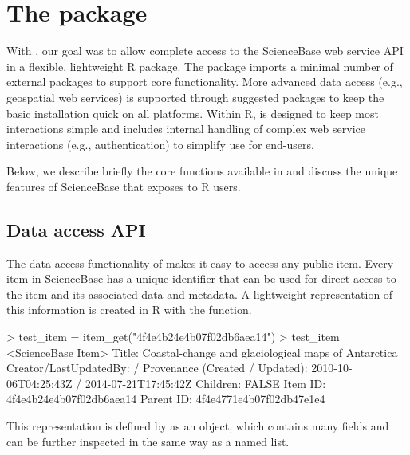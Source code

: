 
\section{The  package}

With , our goal was to allow complete
access to the ScienceBase web service API in a flexible, lightweight
R package. The package imports a minimal number of external packages
to support core functionality. More advanced data access (e.g., geospatial
web services) is supported through suggested packages to keep the basic
installation quick on all platforms. Within R, 
is designed to keep most interactions simple and includes internal
handling of complex web service interactions (e.g., authentication) to
simplify use for end-users.

Below, we describe briefly the core functions available in 
and discuss the unique features of ScienceBase that 
exposes to R users.


\subsection{Data access API}
The data access functionality of  makes it easy to
access any public item. Every item in ScienceBase has a unique identifier
that can be used for direct access to the item and its associated data and
metadata. A lightweight representation of this information is created in R
with the  function.

\begin{example}
> test_item = item_get("4f4e4b24e4b07f02db6aea14")
> test_item
<ScienceBase Item>
  Title: Coastal-change and glaciological maps of Antarctica
  Creator/LastUpdatedBy:      /
  Provenance (Created / Updated):  2010-10-06T04:25:43Z / 2014-07-21T17:45:42Z
  Children: FALSE
  Item ID: 4f4e4b24e4b07f02db6aea14
  Parent ID: 4f4e4771e4b07f02db47e1e4
\end{example}

This representation is defined by  as an  object,
which contains many fields and can be further inspected in the same
way as a named list.



